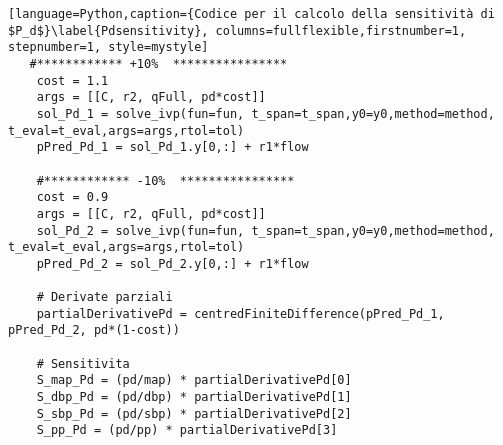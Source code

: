 \begin{lstlisting}[language=Python,caption={Codice per il calcolo della sensitività di $P_d$}\label{Pdsensitivity}, columns=fullflexible,firstnumber=1, stepnumber=1, style=mystyle]
   #************ +10%  ****************
    cost = 1.1
    args = [[C, r2, qFull, pd*cost]]
    sol_Pd_1 = solve_ivp(fun=fun, t_span=t_span,y0=y0,method=method, t_eval=t_eval,args=args,rtol=tol)
    pPred_Pd_1 = sol_Pd_1.y[0,:] + r1*flow
    
    #************ -10%  ****************
    cost = 0.9
    args = [[C, r2, qFull, pd*cost]]
    sol_Pd_2 = solve_ivp(fun=fun, t_span=t_span,y0=y0,method=method, t_eval=t_eval,args=args,rtol=tol)
    pPred_Pd_2 = sol_Pd_2.y[0,:] + r1*flow
    
    # Derivate parziali
    partialDerivativePd = centredFiniteDifference(pPred_Pd_1, pPred_Pd_2, pd*(1-cost))
    
    # Sensitivita
    S_map_Pd = (pd/map) * partialDerivativePd[0]
    S_dbp_Pd = (pd/dbp) * partialDerivativePd[1]
    S_sbp_Pd = (pd/sbp) * partialDerivativePd[2]
    S_pp_Pd = (pd/pp) * partialDerivativePd[3]
\end{lstlisting}